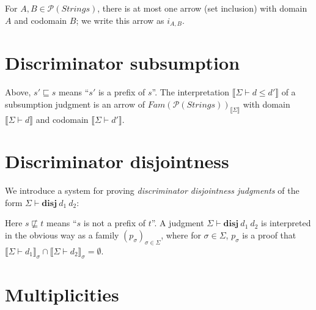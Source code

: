 \documentclass{article}
\newcommand{\mbf}{\mathbf}
\newcommand{\sem}[1]{\llbracket #1 \rrbracket}
\begin{document}
For $A,B \in \mathcal P(\mathit{Strings})$, there is at most one arrow (set inclusion) with domain $A$ and 
codomain $B$; we write this arrow as $i_{A,B}$.


\section*{Discriminator subsumption}


Above, $s' \sqsubseteq s$ means ``$s'$ is a prefix of $s$''. 
The interpretation $\sem{\Sigma \vdash d \leq d'}$ of a subsumption judgment is an arrow of $\mathit{Fam}(\mathcal P(\mathit{Strings}))_{\sem{\Sigma}}$ with domain $\sem{\Sigma \vdash d}$ and codomain $\sem{\Sigma \vdash d'}$. 

\section*{Discriminator disjointness}

We introduce a system for proving \emph{discriminator disjointness judgments} of the form $\Sigma \vdash \mbf{disj}~d_1~d_2$:
Here $s \not \sqsubseteq t$ means ``$s$ is not a prefix of $t$''. A judgment $\Sigma \vdash \mathbf{disj}~d_1~d_2$ is interpreted in the obvious way as a family $(p_\sigma)_{\sigma \in \Sigma}$, where for $\sigma \in \Sigma$, $p_\sigma$ is a proof that $\sem{\Sigma \vdash d_1}_\sigma \cap \sem{\Sigma \vdash d_2}_\sigma = \emptyset$. 


\section*{Multiplicities}
\end{document}
